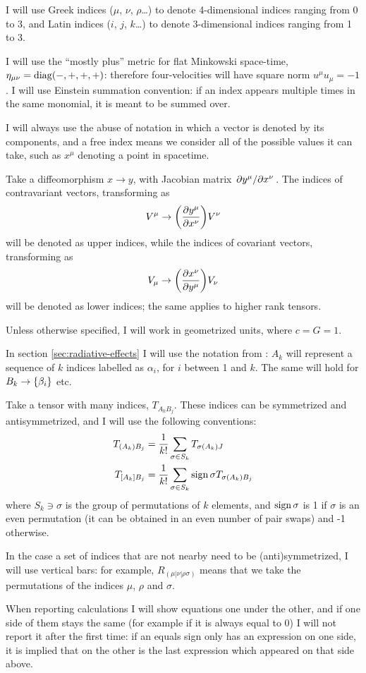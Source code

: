 \documentclass[main.tex]{subfiles}
\begin{document}
I will use Greek indices ($\mu$, $\nu$, $\rho$\dots) to denote 4-dimensional indices ranging from 0 to 3, and Latin indices ($i$, $j$, $k$\dots) to denote 3-dimensional indices ranging from 1 to 3.

I will use the ``mostly plus'' metric for flat Minkowski space-time, $\eta_{\mu \nu} = \operatorname{diag}(-, +, +, +)$: therefore four-velocities will have square norm \(u^\mu u_\mu = -1\).
I will use Einstein summation convention: if an index appears multiple times in the same monomial, it is meant to be summed over.

I will always use the abuse of notation in which a vector is denoted by its components, and a free index means we consider all of the possible values it can take, such as \(x^\mu\) denoting a point in spacetime.

Take a diffeomorphism $x \rightarrow y$, with Jacobian matrix $\pdv*{y^\mu}{x^\nu}$.
The indices of contravariant vectors, transforming as
\begin{equation}
    V^\mu \rightarrow \qty( \pdv{y^\mu}{x^\nu})  V^\nu
\end{equation}
will be denoted as upper indices, while the indices of covariant vectors, transforming as
\begin{equation}
V_\mu \rightarrow \qty( \pdv{x^\nu}{y^\mu})  V_\nu
\end{equation}
will be denoted as lower indices; the same applies to higher rank tensors.

Unless otherwise specified, I will work in geometrized units, where $c = G = 1$.

In section \ref{sec:radiative-effects} I will use the notation from \textcite[]{Thorne:1981feb}: \(A_k\) will represent a sequence of \(k\) indices labelled as \(\alpha_i\), for \(i\) between 1 and \(k\). The same will hold for \(B_k \rightarrow \qty{\beta_i}\) etc.

Take a tensor with many indices, \(T_{A_k B_j}\). These indices can be symmetrized and antisymmetrized, and I will use the following conventions:
\begin{align}
    T_{(A_k) B_j } &= \frac{1}{k!} \sum_{\sigma \in S_k} T_{\sigma(A_k)J} \\
    T_{[A_k]B_j} &= \frac{1}{k!} \sum_{\sigma \in S_k} \sign{\sigma} T_{\sigma(A_k)B_j}
\end{align}
where \(S_k \ni \sigma \) is the group of permutations of $k$ elements, and $\operatorname{sign}{\sigma}$ is 1 if $\sigma$ is an even permutation (it can be obtained in an even number of pair swaps) and -1 otherwise.

In the case a set of indices that are not nearby need to be (anti)symmetrized, I will use vertical bars: for example, \(R_{(\mu | \nu| \rho \sigma)}\) means that we take the permutations of the indices \(\mu\), \(\rho\) and \(\sigma\).

When reporting calculations I will show equations one under the other, and if one side of them stays the same (for example if it is always equal to 0) I will not report it after the first time: if an equals sign only has an expression on one side, it is implied that on the other is the last expression which appeared on that side above.
\end{document}
